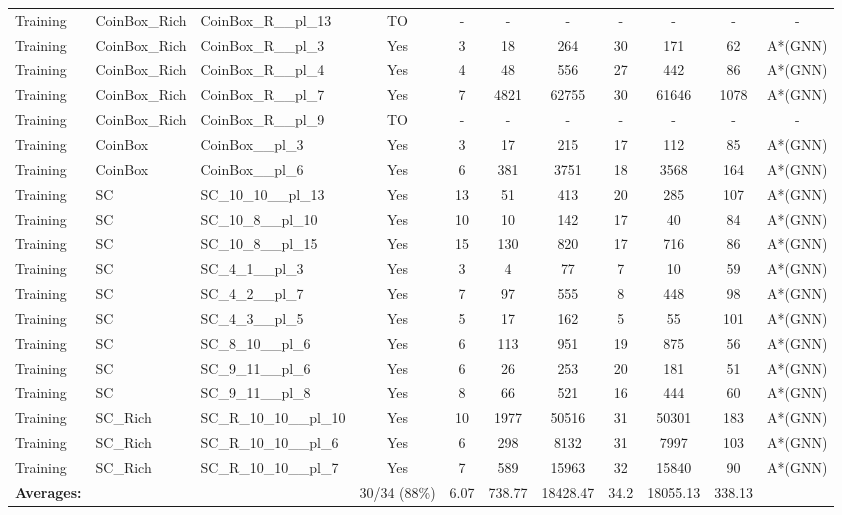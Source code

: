 \documentclass{article}
\begin{document}
\begin{tabular}{lllcccccccc}
Training & CoinBox\_Rich & CoinBox\_R\_\_pl\_13 & TO & - & - & - & - & - & - & - \\
Training & CoinBox\_Rich & CoinBox\_R\_\_pl\_3 & Yes & 3 & 18 & 264 & 30 & 171 & 62 & A*(GNN) \\
Training & CoinBox\_Rich & CoinBox\_R\_\_pl\_4 & Yes & 4 & 48 & 556 & 27 & 442 & 86 & A*(GNN) \\
Training & CoinBox\_Rich & CoinBox\_R\_\_pl\_7 & Yes & 7 & 4821 & 62755 & 30 & 61646 & 1078 & A*(GNN) \\
Training & CoinBox\_Rich & CoinBox\_R\_\_pl\_9 & TO & - & - & - & - & - & - & - \\
Training & CoinBox & CoinBox\_\_pl\_3 & Yes & 3 & 17 & 215 & 17 & 112 & 85 & A*(GNN) \\
Training & CoinBox & CoinBox\_\_pl\_6 & Yes & 6 & 381 & 3751 & 18 & 3568 & 164 & A*(GNN) \\
Training & SC & SC\_10\_10\_\_pl\_13 & Yes & 13 & 51 & 413 & 20 & 285 & 107 & A*(GNN) \\
Training & SC & SC\_10\_8\_\_pl\_10 & Yes & 10 & 10 & 142 & 17 & 40 & 84 & A*(GNN) \\
Training & SC & SC\_10\_8\_\_pl\_15 & Yes & 15 & 130 & 820 & 17 & 716 & 86 & A*(GNN) \\
Training & SC & SC\_4\_1\_\_pl\_3 & Yes & 3 & 4 & 77 & 7 & 10 & 59 & A*(GNN) \\
Training & SC & SC\_4\_2\_\_pl\_7 & Yes & 7 & 97 & 555 & 8 & 448 & 98 & A*(GNN) \\
Training & SC & SC\_4\_3\_\_pl\_5 & Yes & 5 & 17 & 162 & 5 & 55 & 101 & A*(GNN) \\
Training & SC & SC\_8\_10\_\_pl\_6 & Yes & 6 & 113 & 951 & 19 & 875 & 56 & A*(GNN) \\
Training & SC & SC\_9\_11\_\_pl\_6 & Yes & 6 & 26 & 253 & 20 & 181 & 51 & A*(GNN) \\
Training & SC & SC\_9\_11\_\_pl\_8 & Yes & 8 & 66 & 521 & 16 & 444 & 60 & A*(GNN) \\
Training & SC\_Rich & SC\_R\_10\_10\_\_pl\_10 & Yes & 10 & 1977 & 50516 & 31 & 50301 & 183 & A*(GNN) \\
Training & SC\_Rich & SC\_R\_10\_10\_\_pl\_6 & Yes & 6 & 298 & 8132 & 31 & 7997 & 103 & A*(GNN) \\
Training & SC\_Rich & SC\_R\_10\_10\_\_pl\_7 & Yes & 7 & 589 & 15963 & 32 & 15840 & 90 & A*(GNN) \\
\textbf{Averages:} & & & 30/34 (88\%) & 6.07 & 738.77 & 18428.47 & 34.2 & 18055.13 & 338.13 & \\
\bottomrule
\end{tabular}
\newpage
\end{document}

